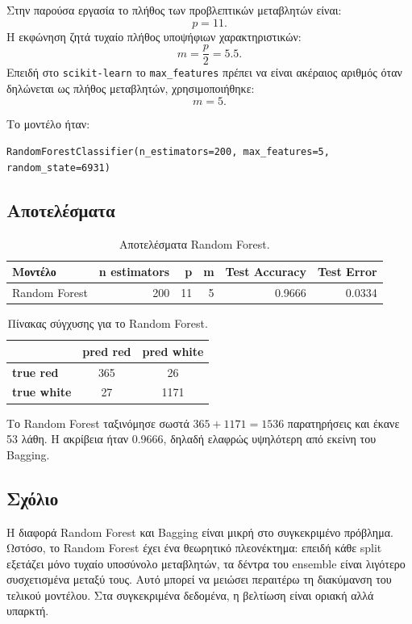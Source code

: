 \documentclass[12pt,a4paper]{article}
\newcommand{\code}[1]{\texttt{\textenglish{#1}}}
\begin{document}
Στην παρούσα εργασία το πλήθος των προβλεπτικών μεταβλητών είναι:
\[
    p=11.
\]
Η εκφώνηση ζητά τυχαίο πλήθος υποψήφιων χαρακτηριστικών:
\[
    m = \frac{p}{2} = 5.5.
\]
Επειδή στο \code{scikit-learn} το \code{max\_features} πρέπει να είναι
ακέραιος αριθμός όταν δηλώνεται ως πλήθος μεταβλητών, χρησιμοποιήθηκε:
\[
    m=5.
\]

Το μοντέλο ήταν:

\begin{center}
\small
\code{RandomForestClassifier(n\_estimators=200, max\_features=5, random\_state=6931)}
\end{center}

\subsection{Αποτελέσματα}

\begin{table}[H]
\centering
\caption{Αποτελέσματα Random Forest.}
\begin{tabular}{lrrrrr}
\toprule
\textbf{Μοντέλο} & \textbf{n estimators} & \textbf{p} & \textbf{m} & \textbf{Test Accuracy} & \textbf{Test Error} \\
\midrule
Random Forest & 200 & 11 & 5 & 0.9666 & 0.0334 \\
\bottomrule
\end{tabular}
\end{table}

\begin{table}[H]
\centering
\caption{Πίνακας σύγχυσης για το Random Forest.}
\begin{tabular}{lcc}
\toprule
& \textbf{pred red} & \textbf{pred white} \\
\midrule
\textbf{true red}   & 365 & 26 \\
\textbf{true white} & 27  & 1171 \\
\bottomrule
\end{tabular}
\end{table}

Το Random Forest ταξινόμησε σωστά $365+1171=1536$ παρατηρήσεις και έκανε 53
λάθη. Η ακρίβεια ήταν 0.9666, δηλαδή ελαφρώς υψηλότερη από εκείνη του
Bagging.

\subsection{Σχόλιο}

Η διαφορά Random Forest και Bagging είναι μικρή στο συγκεκριμένο πρόβλημα.
Ωστόσο, το Random Forest έχει ένα θεωρητικό πλεονέκτημα: επειδή κάθε split
εξετάζει μόνο τυχαίο υποσύνολο μεταβλητών, τα δέντρα του ensemble είναι
λιγότερο συσχετισμένα μεταξύ τους. Αυτό μπορεί να μειώσει περαιτέρω τη
διακύμανση του τελικού μοντέλου. Στα συγκεκριμένα δεδομένα, η βελτίωση είναι
οριακή αλλά υπαρκτή.
\end{document}
